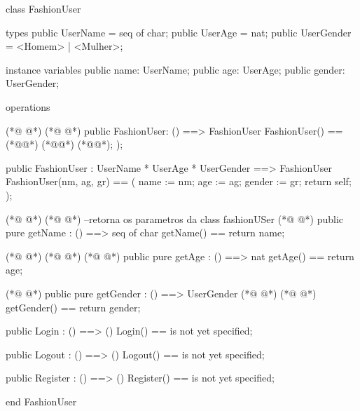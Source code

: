 \begin{vdmpp}[breaklines=true]
class FashionUser

types
 public UserName = seq of char;
 public UserAge = nat;
 public UserGender = <Homem> | <Mulher>;
 
instance variables
 public name: UserName;
 public age: UserAge;
 public gender: UserGender;

operations

(*@
\label{FashionUser:15}
@*)
(*@
\label{Utilizador:15}
@*)
public FashionUser: () ==> FashionUser
  FashionUser() ==
   (*@\vdmnotcovered{(}@*)
    (*@@*) (*@@*);
  );
  
  public FashionUser : 
            UserName *
            UserAge *
            UserGender ==> FashionUser
  FashionUser(nm, ag, gr) ==
  (
    name := nm;
    age := ag;
    gender := gr;
    return self;
  );
  
(*@
\label{Login:33}
@*)
(*@
\label{Login:33}
@*)
  --retorna os parametros da class fashionUSer
(*@
\label{getName:34}
@*)
  public pure getName : () ==> seq of char
    getName() == return name;
    
(*@
\label{getAge:37}
@*)
(*@
\label{Logout:37}
@*)
(*@
\label{Logout:37}
@*)
   public pure getAge : () ==> nat
     getAge() == return age;
     
(*@
\label{getGender:40}
@*)
  public pure getGender : () ==> UserGender
(*@
\label{Register:41}
@*)
(*@
\label{Register:41}
@*)
     getGender() == return gender;
  
  public  Login : ()  ==> ()
  Login() ==
    is not yet specified;

  public  Logout : ()  ==> ()
  Logout() ==
    is not yet specified;

  public  Register : ()  ==> ()
  Register() ==
    is not yet specified;


end FashionUser
\end{vdmpp}
\bigskip
